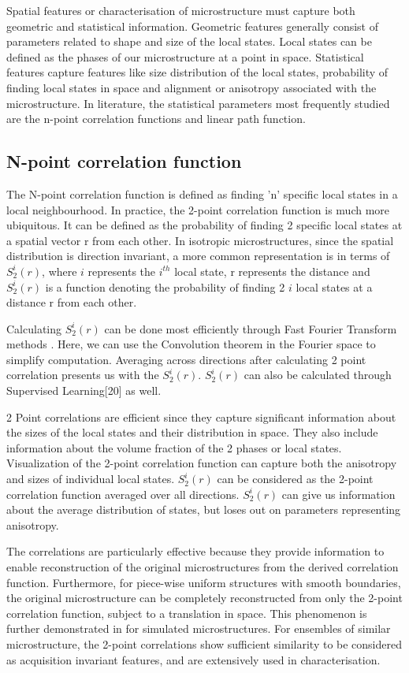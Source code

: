 \documentclass[12pt, a4paper]{report}
\begin{document}
Spatial features or characterisation of microstructure must capture both geometric and statistical information. Geometric features generally consist of parameters related to shape and size of the local states. Local states can be defined as the phases of our microstructure at a point in space. Statistical features capture features like size distribution of the local states, probability of finding local states in space and alignment or anisotropy associated with the microstructure. In literature, the statistical parameters most frequently studied are the n-point correlation functions and linear path function.

\subsection{N-point correlation function}
The N-point correlation function is defined as finding 'n' specific local states in a local neighbourhood. In practice, the 2-point correlation function is much more ubiquitous. It can be defined as the probability of finding 2 specific local states at a spatial vector r from each other.
In isotropic microstructures, since the spatial distribution is direction invariant, a more common representation is in terms of $S_2^i(r)$, where $i$ represents the $i^{th}$ local state, r represents the distance and $S_2^i(r)$ is a function denoting the probability of finding 2 $i$ local states at a distance r from each other. 

Calculating $S_2^i(r)$ can be done most efficiently through Fast Fourier Transform methods \cite{12fullwood2008gradient}. Here, we can use the Convolution theorem in the Fourier space to simplify computation. Averaging across directions after calculating 2 point correlation presents us with the $S_2^i(r)$. $S_2^i(r)$ can also be calculated through Supervised Learning[20] as well.

2 Point correlations are efficient since they capture significant information about the sizes of the local states and their distribution in space. They also include information about the volume fraction of the 2 phases or local states. Visualization of the 2-point correlation function can capture both the anisotropy and sizes of individual local states. $S_2^i(r)$ can be considered as the 2-point correlation function averaged over all directions. $S_2^i(r)$ can give us information about the average distribution of states, but loses out on parameters representing anisotropy.

The correlations are particularly effective because they provide information to enable reconstruction of the original microstructures from the derived correlation function. Furthermore, for piece-wise uniform structures with smooth boundaries, the original microstructure can be completely reconstructed from only the 2-point correlation function\cite{5rozman2002uniqueness}, subject to a translation in space. This phenomenon is further demonstrated in \cite{4fullwood2008microstructure} for simulated microstructures. For ensembles of similar microstructure, the 2-point correlations show sufficient similarity to be considered as acquisition invariant features, and are extensively used in characterisation.
\end{document}
